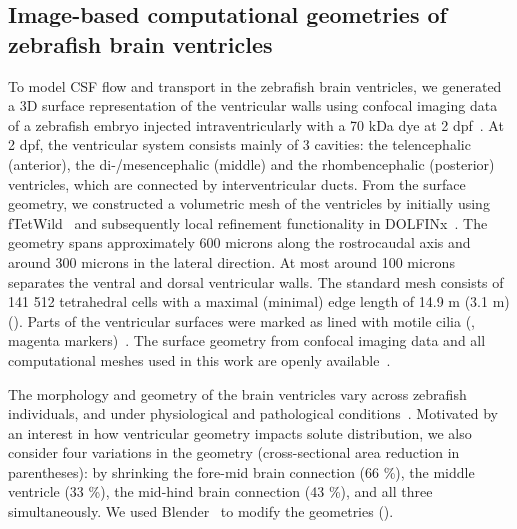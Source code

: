 \documentclass{WileyMSP-template}
\begin{document}
\subsection{Image-based computational geometries of zebrafish brain ventricles}\label{sec:image_based_geometry}
To model CSF flow and transport in the zebrafish brain ventricles, we
generated a 3D surface representation of the ventricular walls using
confocal imaging data of a zebrafish embryo injected
intraventricularly with a 70 kDa dye at 2
dpf~\cite{Olstad2019CiliaryDevelopment}. At 2 dpf, the ventricular
system consists mainly of 3 cavities: the telencephalic (anterior),
the di-/mesencephalic (middle) and the rhombencephalic (posterior)
ventricles, which are connected by interventricular ducts. From the
surface geometry, we constructed a volumetric mesh of the ventricles
by initially using fTetWild~\cite{Hu2020FastWild} and subsequently
local refinement functionality in DOLFINx~\cite{dolfinx2023preprint}. 
The geometry spans approximately 600 microns along the rostrocaudal axis
and around 300 microns in the lateral direction. At most around
100 microns separates the ventral and dorsal ventricular walls.
The standard mesh consists of 141 512 tetrahedral cells with a
maximal (minimal) edge length of 14.9 \textmu
m (3.1 \textmu m) (). Parts of the
ventricular surfaces were marked as lined with motile cilia
(, magenta
markers)~\cite{Olstad2019CiliaryDevelopment}.
The surface geometry from confocal imaging data
and all computational meshes used in this work are openly
available~\cite{Herlyng2025Zenodo}.

The morphology and geometry of the brain ventricles vary across zebrafish
individuals, and under physiological and pathological conditions~\cite{Olstad2019CiliaryDevelopment}. 
Motivated by an interest in how ventricular geometry impacts solute distribution,
we also consider four variations in the geometry (cross-sectional area
reduction in parentheses):
by shrinking the fore-mid brain connection (66 \%), 
the middle ventricle (33 \%), the mid-hind brain connection (43 \%), and all three simultaneously.
We used Blender~\cite{Community2018BlenderPackage} to modify the geometries ().
\end{document}
